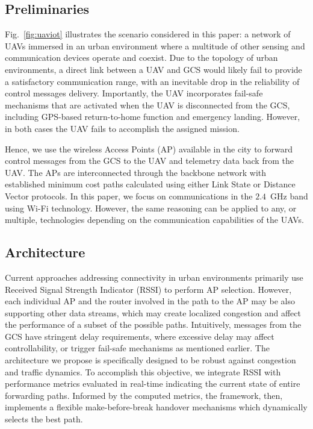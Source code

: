 
\subsection{Preliminaries}
Fig.~\ref{fig:uaviot} illustrates the scenario considered in this paper: a network of UAVs immersed in an urban environment where a multitude of other sensing and communication devices operate and coexist. %
Due to the topology of urban environments, a direct link between a UAV and GCS would likely fail to provide a satisfactory communication range, with an inevitable drop in the reliability of control messages delivery. Importantly, the UAV incorporates fail-safe mechanisms that are activated when the UAV is disconnected from the GCS, including GPS-based return-to-home function and emergency landing. However, in both cases the UAV fails to accomplish the assigned mission. 

Hence, we use the wireless Access Points (AP) available in the city to forward control messages from the GCS to the UAV and telemetry data back from the UAV. The APs are interconnected through the backbone network with established minimum cost paths calculated using either Link State or Distance Vector protocols. In this paper, we focus on communications in the $2.4$~GHz band using Wi-Fi technology. However, the same reasoning can be applied to any, or multiple, technologies depending on the communication capabilities of the UAVs.


\subsection{Architecture}

Current approaches addressing connectivity in urban environments primarily use Received Signal Strength Indicator (RSSI) to perform AP selection. However, each individual AP and the router involved in the path to the AP may be also supporting other data streams, which may create localized congestion and affect the performance of a subset of the possible paths. Intuitively, messages from the GCS have stringent delay requirements, where excessive delay may affect controllability, or trigger fail-safe mechanisms as mentioned earlier. The architecture we propose is specifically designed to be robust against congestion and traffic dynamics. To accomplish this objective, we integrate RSSI with performance metrics evaluated in real-time indicating the current state of entire forwarding paths. Informed by the computed metrics, the framework, then, implements a flexible make-before-break handover mechanisms which dynamically selects the best path.


